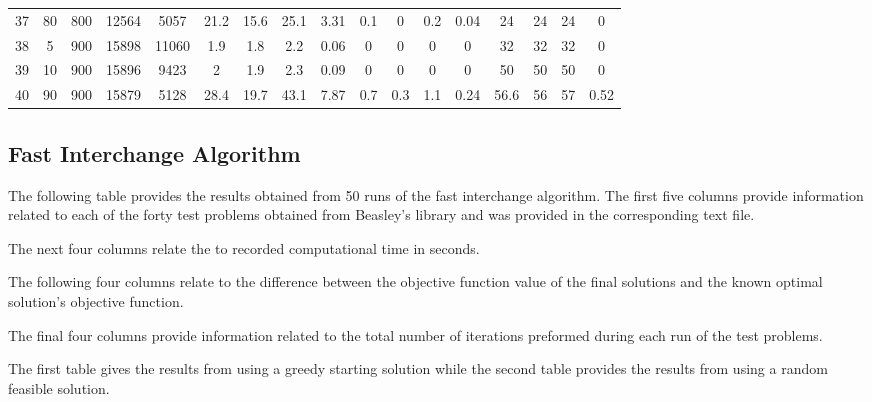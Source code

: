 \documentclass[11pt]{article}
\begin{document}
\begin{appendices}
\begin{landscape}
\begin{longtable}[c]{ccccc|cccc|cccc|cccc}
				37 & 80 & 800 & 12564 & 5057 & 21.2 & 15.6 & 25.1 & 3.31 & 0.1 & 0 & 0.2 & 0.04 & 24 & 24 & 24 & 0 \\
				\rowcolor[HTML]{EFEFEF} 
				38 & 5 & 900 & 15898 & 11060 & 1.9 & 1.8 & 2.2 & 0.06 & 0 & 0 & 0 & 0 & 32 & 32 & 32 & 0 \\
				\rowcolor[HTML]{EFEFEF} 
				39 & 10 & 900 & 15896 & 9423 & 2 & 1.9 & 2.3 & 0.09 & 0 & 0 & 0 & 0 & 50 & 50 & 50 & 0 \\
				\rowcolor[HTML]{EFEFEF} 
				40 & 90 & 900 & 15879 & 5128 & 28.4 & 19.7 & 43.1 & 7.87 & 0.7 & 0.3 & 1.1 & 0.24 & 56.6 & 56 & 57 & 0.52
			\end{longtable}
		\end{landscape}
		
		
		\subsection{Fast Interchange Algorithm}
		
		The following table provides the results obtained from 50 runs of the fast interchange algorithm.  The first five columns provide information related to each of the forty test problems obtained from Beasley's library \cite{BEAS90} and was provided in the corresponding text file.
		
		The next four columns relate the to recorded computational time in seconds.
		
		The following four columns relate to the difference between the objective function value of the final solutions and the known optimal solution's objective function.
		
		The final four columns provide information related to the total number of iterations preformed during each run of the test problems.
		
		The first table gives the results from using a greedy starting solution while the second table provides the results from using a random feasible solution.
		

\end{appendices}
\end{document}
